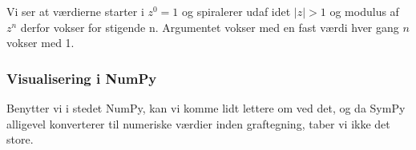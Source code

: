 \documentclass[letterpaper,10pt,english]{jupyterBook}
\begin{document}
\begin{sphinxVerbatim}[commandchars=\\\{\}]
  \PYG{p}{[}\PYG{p}{]}
  \PYG{p}{[}\PYG{p}{]}

   

  

        
        
\end{sphinxVerbatim}

\noindent{}

Vi ser at værdierne starter i \(z^0 = 1\) og spiralerer udaf idet \(|z|>1\) og modulus af \(z^n\) derfor vokser for stigende n. Argumentet vokser med en fast værdi hver gang \(n\) vokser med 1.


\subsubsection{Visualisering i NumPy}
\label{\detokenize{notebooks/sympy/Notebook_kompleks:visualisering-i-numpy}}
Benytter vi i stedet NumPy, kan vi komme lidt lettere om ved det, og da SymPy alligevel konverterer til numeriske værdier inden graftegning, taber vi ikke det store.
\end{document}
